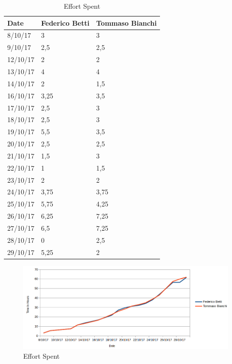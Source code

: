 
\begin{table}[H]	
	\centering
	\def\arraystretch{1.5}
	\begin{tabular}{|m{5cm}|m{5cm}|m{5cm}|}
		\hline
		\textbf{Date} & \textbf{Federico Betti} & \textbf{Tommaso Bianchi} \\ \hline
		8/10/17 &	3 &	3 \\ \hline
		9/10/17 &	2,5 &	2,5\\ \hline
		12/10/17 &	2 &	2\\ \hline
		13/10/17 &	4 &	4\\ \hline
		14/10/17 &	2 &	1,5\\ \hline
		16/10/17 &	3,25 &	3,5\\ \hline
		17/10/17 &	2,5 &	3\\ \hline
		18/10/17 &	2,5 &	3\\ \hline
		19/10/17 &	5,5 &	3,5\\ \hline
		20/10/17 &	2,5 &	2,5\\ \hline
		21/10/17 &	1,5 &	3\\ \hline
		22/10/17 &	1 &	1,5\\ \hline
		23/10/17 &	2 &	2\\ \hline
		24/10/17 &	3,75 &	3,75\\ \hline
		25/10/17 &	5,75 &	4,25\\ \hline
		26/10/17 &	6,25 &	7,25\\ \hline
		27/10/17 &	6,5 &	7,25\\ \hline
		28/10/17 &	0 &	2,5\\ \hline
		29/10/17 &	5,25 &	2\\ \hline
		
	\end{tabular}
	\caption{Effort Spent}
\end{table}

\begin{figure}[H]
	\centering\includegraphics[width=\textwidth]{EffortSpent/effortSpentGraph.png}
	\caption{Effort Spent}
\end{figure}